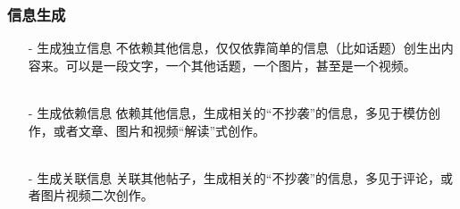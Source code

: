 \documentclass[../Postbot.tex]{subfiles}
\begin{document}
    \begin{frame}
        \frametitle{信息生成}
        \begin{itemize}
            \item[-]{
                生成独立信息
                \qquad 不依赖其他信息，仅仅依靠简单的信息（比如话题）创生出内容来。可以是一段文字，一个其他话题，一个图片，甚至是一个视频。\\
                \hspace*{\fill} \\
                }
            \item[-]{
                生成依赖信息
                \qquad 依赖其他信息，生成相关的“不抄袭”的信息，多见于模仿创作，或者文章、图片和视频“解读”式创作。 \\
                \hspace*{\fill} \\
                } 
            \item[-]{
                生成关联信息
                \qquad 关联其他帖子，生成相关的“不抄袭”的信息，多见于评论，或者图片视频二次创作。 \\
                \hspace*{\fill} \\
                } 
        \end{itemize}
    \end{frame}
\end{document}
